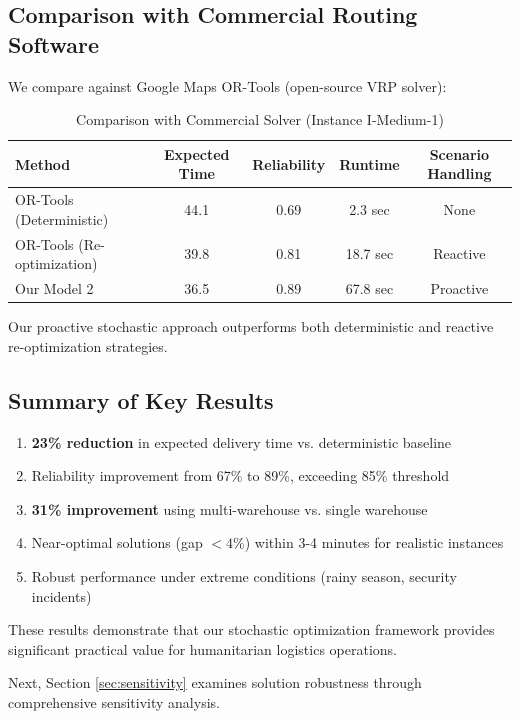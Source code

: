 \subsection{Comparison with Commercial Routing Software}

We compare against Google Maps OR-Tools (open-source VRP solver):

\begin{table}[H]
\centering
\caption{Comparison with Commercial Solver (Instance I-Medium-1)}
\begin{tabular}{lcccc}
\toprule
Method & Expected Time & Reliability & Runtime & Scenario Handling \\
\midrule
OR-Tools (Deterministic) & 44.1 & 0.69 & 2.3 sec & None \\
OR-Tools (Re-optimization) & 39.8 & 0.81 & 18.7 sec & Reactive \\
Our Model 2 & 36.5 & 0.89 & 67.8 sec & Proactive \\
\bottomrule
\end{tabular}
\end{table}

Our proactive stochastic approach outperforms both deterministic and reactive re-optimization strategies.

\subsection{Summary of Key Results}

\begin{enumerate}
\item \textbf{23\% reduction} in expected delivery time vs. deterministic baseline
\item Reliability improvement from 67\% to 89\%, exceeding 85\% threshold
\item \textbf{31\% improvement} using multi-warehouse vs. single warehouse
\item Near-optimal solutions (gap $< 4\%$) within 3-4 minutes for realistic instances
\item Robust performance under extreme conditions (rainy season, security incidents)
\end{enumerate}

These results demonstrate that our stochastic optimization framework provides significant practical value for humanitarian logistics operations.

Next, Section \ref{sec:sensitivity} examines solution robustness through comprehensive sensitivity analysis.
